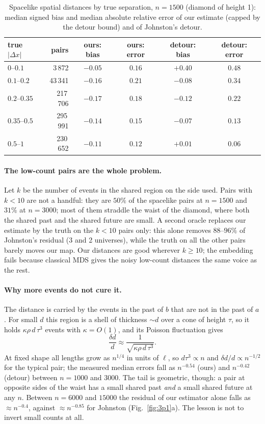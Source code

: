 \documentclass[11pt,a4paper]{article}
\begin{document}
\begin{table}[t]
\centering\small
\begin{tabular}{@{}lrcccc@{}}
\toprule
true $|\Delta x|$ & pairs & ours: bias & ours: error & detour: bias & detour: error\\
\midrule
$0$--$0.1$ & 3\,872 & $-0.05$ & $0.16$ & $+0.40$ & $0.48$\\
$0.1$--$0.2$ & 43\,341 & $-0.16$ & $0.21$ & $-0.08$ & $0.34$\\
$0.2$--$0.35$ & 217\,706 & $-0.17$ & $0.18$ & $-0.12$ & $0.22$\\
$0.35$--$0.5$ & 295\,991 & $-0.14$ & $0.15$ & $-0.07$ & $0.13$\\
$0.5$--$1$ & 230\,652 & $-0.11$ & $0.12$ & $+0.01$ & $0.06$\\
\bottomrule
\end{tabular}
\caption{Spacelike spatial distances by true separation, $n=1500$ (diamond of height 1): median signed bias and median absolute relative error of our estimate (capped by the detour bound) and of Johnston's detour.}
\label{tab:profile}
\end{table}

\paragraph{The low-count pairs are the whole problem.} Let $k$ be the number of events in the shared region on the side used. Pairs with $k<10$ are not a handful: they are $50\%$ of the spacelike pairs at $n=1500$ and $31\%$ at $n=3000$; most of them straddle the waist of the diamond, where both the shared past and the shared future are small. A second oracle replaces our estimate by the truth on the $k<10$ pairs only: this alone removes $88$--$96\%$ of Johnston's residual (3 and 2 universes), while the truth on all the other pairs barely moves our map. Our distances are good wherever $k\ge10$; the embedding fails because classical MDS gives the noisy low-count distances the same voice as the rest.

\paragraph{Why more events do not cure it.} The distance is carried by the events in the past of $b$ that are not in the past of $a$. For small $d$ this region is a shell of thickness $\sim d$ over a cone of height $\tau$, so it holds $\kappa\rho\,d\,\tau^3$ events with $\kappa=O(1)$, and its Poisson fluctuation gives
\begin{equation}
\frac{\delta d}{d}\approx\frac1{\sqrt{\kappa\rho\,d\,\tau^3}}.
\end{equation}
At fixed shape all lengths grow as $n^{1/4}$ in units of $\ell$, so $d\tau^3\propto n$ and $\delta d/d\propto n^{-1/2}$ for the typical pair; the measured median errors fall as $n^{-0.54}$ (ours) and $n^{-0.42}$ (detour) between $n=1000$ and $3000$. The tail is geometric, though: a pair at opposite sides of the waist has a small shared past \emph{and} a small shared future at any $n$. Between $n=6000$ and $15000$ the residual of our estimator alone falls as $\approx n^{-0.4}$, against $\approx n^{-0.85}$ for Johnston (Fig.~\ref{fig:3p1}a). The lesson is not to invert small counts at all.
\end{document}
